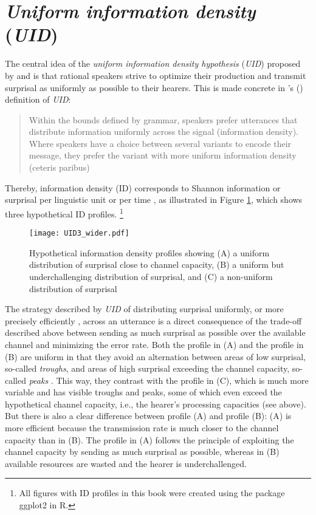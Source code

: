 \section{\textit{Uniform information density} (\textit{UID})}\label{sec:info.theory.uid} 
The central idea of the \textit{uniform information density hypothesis} (\textit{UID}) proposed by \citet{levy.jaeger2007} and \citet{jaeger2010} is that rational speakers strive to optimize their production and transmit surprisal as uniformly as possible to their hearers.
This is made concrete in \citeauthor{jaeger2010}'s (\citeyear[25]{jaeger2010}) definition of \textit{UID}:
\begin{quote}
Within the bounds defined by grammar, speakers prefer utterances that distribute information  uniformly across the signal (information density). Where speakers have a choice between several variants to encode their message, they prefer the variant with more uniform information density (ceteris paribus)
\end{quote}
Thereby, information density (ID) corresponds to Shannon information or surprisal per linguistic  unit \citep[849]{levy.jaeger2007} or per time \citep[25]{jaeger2010}, as illustrated in Figure \ref{fig:UID}, which shows three hypothetical ID profiles.%
\footnote{All figures with ID profiles in this book were created using the package ggplot2 \citep{wickham2016} in R.}
%

\begin{figure}
\centering
\texttt{[image: UID3\_wider.pdf]}
\caption{Hypothetical information density profiles showing (A) a uniform distribution of surprisal close to channel capacity,   (B) a uniform but underchallenging distribution of surprisal, and (C) a non-uniform distribution of surprisal}
\label{fig:UID}
\end{figure}

The strategy described by \textit{UID} of distributing surprisal uniformly, or more precisely efficiently \citep{jaeger2010}, across an utterance is a direct consequence of the trade-off described above between sending as much surprisal as possible over the available channel and minimizing the error rate.
Both the profile in (A) and the profile in (B) are uniform in that they avoid an alternation between areas of low surprisal, so-called \textit{troughs}, and areas of high surprisal exceeding the channel capacity,  so-called \textit{peaks} \citep[849]{levy.jaeger2007}.
This way, they contrast with the profile in (C), which is much more variable and has visible troughs and peaks, some of which even exceed the hypothetical channel capacity,  i.e., the hearer's processing capacities (see above).
But there is also a clear difference between profile (A) and profile (B):
(A) is more efficient because the transmission rate is much closer to the channel capacity  than in (B).
The profile in (A) follows the principle of exploiting the channel capacity  by sending as much surprisal as possible, whereas in (B) available resources are wasted and the hearer is underchallenged.

